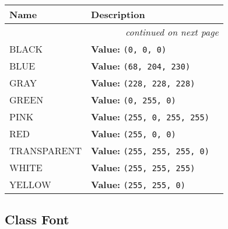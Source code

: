    \vspace{-1cm}
\hspace{\varindent}\begin{longtable}{|p{\varnamewidth}|p{\vardescrwidth}|l}
\cline{1-2}
\cline{1-2} \centering \textbf{Name} & \centering \textbf{Description}& \\
\cline{1-2}
\endhead\cline{1-2}\multicolumn{3}{r}{\small\textit{continued on next page}}\\\endfoot\cline{1-2}
\endlastfoot\raggedright B\-L\-A\-C\-K\- & \raggedright \textbf{Value:} 
{\tt \texttt{(}0\texttt{, }0\texttt{, }0\texttt{)}}&\\
\cline{1-2}
\raggedright B\-L\-U\-E\- & \raggedright \textbf{Value:} 
{\tt \texttt{(}68\texttt{, }204\texttt{, }230\texttt{)}}&\\
\cline{1-2}
\raggedright G\-R\-A\-Y\- & \raggedright \textbf{Value:} 
{\tt \texttt{(}228\texttt{, }228\texttt{, }228\texttt{)}}&\\
\cline{1-2}
\raggedright G\-R\-E\-E\-N\- & \raggedright \textbf{Value:} 
{\tt \texttt{(}0\texttt{, }255\texttt{, }0\texttt{)}}&\\
\cline{1-2}
\raggedright P\-I\-N\-K\- & \raggedright \textbf{Value:} 
{\tt \texttt{(}255\texttt{, }0\texttt{, }255\texttt{, }255\texttt{)}}&\\
\cline{1-2}
\raggedright R\-E\-D\- & \raggedright \textbf{Value:} 
{\tt \texttt{(}255\texttt{, }0\texttt{, }0\texttt{)}}&\\
\cline{1-2}
\raggedright T\-R\-A\-N\-S\-P\-A\-R\-E\-N\-T\- & \raggedright \textbf{Value:} 
{\tt \texttt{(}255\texttt{, }255\texttt{, }255\texttt{, }0\texttt{)}}&\\
\cline{1-2}
\raggedright W\-H\-I\-T\-E\- & \raggedright \textbf{Value:} 
{\tt \texttt{(}255\texttt{, }255\texttt{, }255\texttt{)}}&\\
\cline{1-2}
\raggedright Y\-E\-L\-L\-O\-W\- & \raggedright \textbf{Value:} 
{\tt \texttt{(}255\texttt{, }255\texttt{, }0\texttt{)}}&\\
\cline{1-2}
\end{longtable}



\subsection{Class Font}

